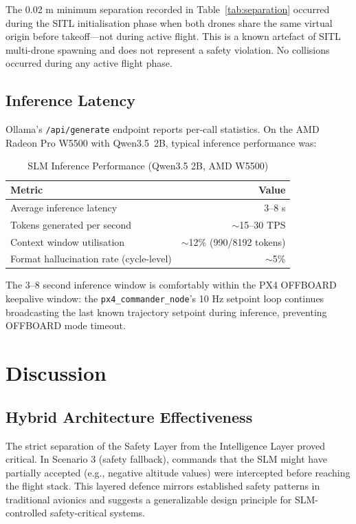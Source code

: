 \documentclass[conference]{IEEEtran}
\begin{document}
The 0.02 m minimum separation recorded in Table~\ref{tab:separation} occurred during the SITL initialisation phase when both drones share the same virtual origin before takeoff—not during active flight. This is a known artefact of SITL multi-drone spawning and does not represent a safety violation. No collisions occurred during any active flight phase.

\subsection{Inference Latency}

Ollama's \texttt{/api/generate} endpoint reports per-call statistics. On the AMD Radeon Pro W5500 with Qwen3.5~2B, typical inference performance was:

\begin{table}[htbp]
\caption{SLM Inference Performance (Qwen3.5 2B, AMD W5500)}
\label{tab:latency}
\centering
\begin{tabular}{lr}
\toprule
\textbf{Metric} & \textbf{Value} \\
\midrule
Average inference latency & 3–8 s \\
Tokens generated per second & $\sim$15–30 TPS \\
Context window utilisation & $\sim$12\% (990/8192 tokens) \\
Format hallucination rate (cycle-level) & $\sim$5\% \\
\bottomrule
\end{tabular}
\end{table}

The 3–8 second inference window is comfortably within the PX4 OFFBOARD keepalive window: the \texttt{px4\_commander\_node}'s 10 Hz setpoint loop continues broadcasting the last known trajectory setpoint during inference, preventing OFFBOARD mode timeout.

\section{Discussion}
\label{sec:discussion}

\subsection{Hybrid Architecture Effectiveness}

The strict separation of the Safety Layer from the Intelligence Layer proved critical. In Scenario 3 (safety fallback), commands that the SLM might have partially accepted (e.g., negative altitude values) were intercepted before reaching the flight stack. This layered defence mirrors established safety patterns in traditional avionics \cite{ref_avionic_safety} and suggests a generalizable design principle for SLM-controlled safety-critical systems.
\end{document}
